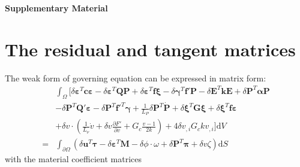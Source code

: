 \documentclass[times,fleqn,11pt]{elsarticle}
\begin{document}



\newpage

\renewcommand{\thefigure}{S\arabic{figure}}
\renewcommand{\theequation}{S\arabic{equation}}
\renewcommand{\thesection}{S\arabic{section}}

\setcounter{figure}{0}  %
\setcounter{equation}{0}
\setcounter{section}{0}

{\centering \large \textbf{Supplementary Material}}
\section{The residual and tangent matrices}
The weak form of governing equation can be expressed in matrix form:
\begin{equation}\label{eq23}
    \begin{split}
        &\int_\Omega\bigg[ \delta\mathbf{\varepsilon}^T\mathbf{c}\mathbf{\varepsilon}-\delta\mathbf{\varepsilon}^T\mathbf{Q}\mathbf{P}+\delta\mathbf{\varepsilon}^T\mathbf{f}\mathbf{\xi}-\delta\mathbf{\gamma}^T\mathbf{f'}\mathbf{P}-\delta\mathbf{E}^T\mathbf{k}\mathbf{E}+\delta\mathbf{P}^T\mathbf{\alpha}\mathbf{P}\\
        &-\delta\mathbf{P}^T\mathbf{Q'}\mathbf{\varepsilon}-\delta\mathbf{P}^T{\mathbf{f}'}^T\mathbf{\gamma}+\frac{1}{L_P}\delta\mathbf{P}^T \mathbf{\dot{P}} +\delta\mathbf{\xi}^T\mathbf{G}\mathbf{\xi}+\delta\mathbf{\xi}^T\mathbf{f}\mathbf{\varepsilon}\\
        &+\delta v\cdot\left( \frac{1}{L_\nu} \dot{v}+ \delta v\frac{\partial F'}{\partial v}+G_c\frac{v-1}{2k} \right)+4\delta v_{,i}G_ckv_{,i} \bigg] \mathrm{d} V\\
        =&\int_{\partial \Omega} \left( \delta \mathbf{u}^T\mathbf{\tau}-\delta \mathbf{\varepsilon}^T\mathbf{M}-\delta \phi \cdot \omega + \delta\mathbf{P}^T\mathbf{\pi}+\delta v\zeta\right)\mathrm{d}S
    \end{split}
\end{equation}
with the material coefficient matrices
\end{document}
